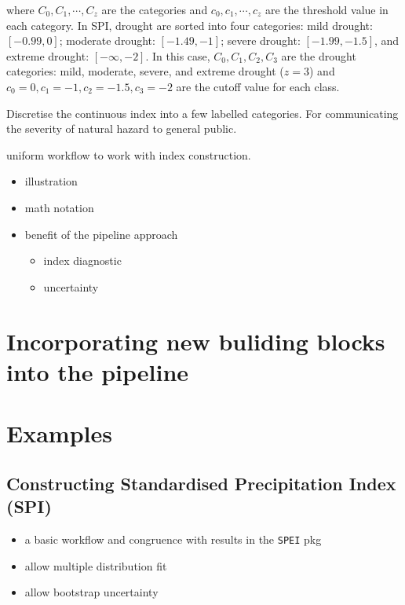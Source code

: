 \documentclass[
]{article}
\providecommand{\tightlist}{%
  \setlength{\itemsep}{0pt}\setlength{\parskip}{0pt}}\usepackage{longtable,booktabs,array}
\begin{document}
where \(C_0, C_1,\cdots ,C_z\) are the categories and
\(c_0, c_1, \cdots, c_z\) are the threshold value in each category. In
SPI, drought are sorted into four categories: mild drought:
\([-0.99, 0]\); moderate drought: \([-1.49, -1]\); severe drought:
\([-1.99, -1.5]\), and extreme drought: \([-\infty, -2]\). In this case,
\(C_0, C_1, C_2, C_3\) are the drought categories: mild, moderate,
severe, and extreme drought (\(z = 3\)) and
\(c_0 =0, c_1 = -1, c_2 = -1.5, c_3 = -2\) are the cutoff value for each
class.

Discretise the continuous index into a few labelled categories. For
communicating the severity of natural hazard to general public.

uniform workflow to work with index construction.

\begin{itemize}
\tightlist
\item
  illustration
\item
  math notation
\item
  benefit of the pipeline approach

  \begin{itemize}
  \tightlist
  \item
    index diagnostic
  \item
    uncertainty
  \end{itemize}
\end{itemize}

\hypertarget{sec-incorporating-new-buliding-blocks-into-the-pipeline}{%
\section{Incorporating new buliding blocks into the
pipeline}\label{sec-incorporating-new-buliding-blocks-into-the-pipeline}}

\hypertarget{sec-examples}{%
\section{Examples}\label{sec-examples}}

\hypertarget{constructing-standardised-precipitation-index-spi}{%
\subsection{Constructing Standardised Precipitation Index
(SPI)}\label{constructing-standardised-precipitation-index-spi}}

\begin{itemize}
\tightlist
\item
  a basic workflow and congruence with results in the \texttt{SPEI} pkg
\item
  allow multiple distribution fit
\item
  allow bootstrap uncertainty
\end{itemize}
\end{document}
